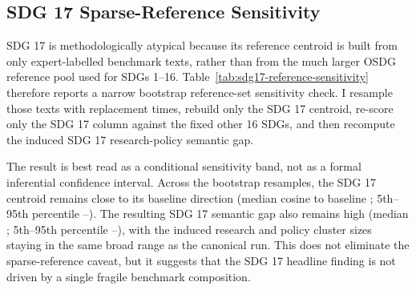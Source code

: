\documentclass[12pt,a4paper]{article}
\begin{document}
\begin{table}[ht]
\centering
\small
\caption{Lexical interpretability check for selected semantic-gap cases. Terms are generated from deterministic samples of research and policy texts assigned to each SDG. The table is descriptive only and is not used to relabel records or replace the embedding-based semantic-gap estimates.}
\label{tab:semantic-gap-text-interpretability}
\resizebox{\textwidth}{!}{%

}
\end{table}

\subsection{SDG 17 Sparse-Reference Sensitivity}
\label{app:sdg17-reference-sensitivity}

SDG 17 is methodologically atypical because its reference centroid is built from only \SdgSeventeenBenchmarkN{} expert-labelled benchmark texts, rather than from the much larger OSDG reference pool used for SDGs 1--16. Table~\ref{tab:sdg17-reference-sensitivity} therefore reports a narrow bootstrap reference-set sensitivity check. I resample those \SdgSeventeenBenchmarkN{} texts with replacement \SdgSeventeenBootstrapDraws{} times, rebuild only the SDG 17 centroid, re-score only the SDG 17 column against the fixed other 16 SDGs, and then recompute the induced SDG 17 research-policy semantic gap.

The result is best read as a conditional sensitivity band, not as a formal inferential confidence interval. Across the bootstrap resamples, the SDG 17 centroid remains close to its baseline direction (median cosine to baseline \SdgSeventeenBootstrapCosineMedian{}; 5th--95th percentile \SdgSeventeenBootstrapCosinePFive{}--\SdgSeventeenBootstrapCosinePNinetyFive{}). The resulting SDG 17 semantic gap also remains high (median \SdgSeventeenBootstrapGapMedian{}; 5th--95th percentile \SdgSeventeenBootstrapGapPFive{}--\SdgSeventeenBootstrapGapPNinetyFive{}), with the induced research and policy cluster sizes staying in the same broad range as the canonical run. This does not eliminate the sparse-reference caveat, but it suggests that the SDG 17 headline finding is not driven by a single fragile benchmark composition.

\begin{table}[ht]
\centering
\small
\caption{SDG 17 sparse-reference sensitivity diagnostic. The bootstrap resamples only the 31 SDG 17 benchmark texts used to build the SDG 17 centroid, then recomputes the induced SDG 17 semantic gap. It is a conditional reference-set sensitivity check rather than a formal inferential confidence interval.}
\label{tab:sdg17-reference-sensitivity}

\end{table}
\end{document}
